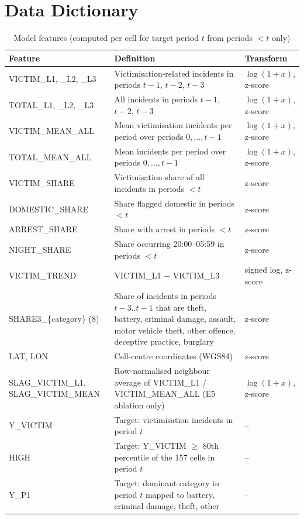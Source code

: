 \documentclass[11pt,a4paper]{report}
\renewcommand{\thesection}{\thechapter.\arabic{section}}
\begin{document}
\appendix
\renewcommand{\thesection}{\thechapter.\arabic{section}}

\chapter{Data Dictionary}
\label{app:dict}
\begin{table}[H]
\centering\scriptsize
\caption{Model features (computed per cell for target period $t$ from periods $<t$ only)}
\label{tab:dict}
\begin{tabularx}{\textwidth}{@{}L{4.2cm} Y L{2.6cm}@{}}
\toprule
Feature & Definition & Transform\\
\midrule
VICTIM\_L1, \_L2, \_L3 & Victimisation-related incidents in periods $t-1$, $t-2$, $t-3$ & $\log(1+x)$, z-score\\
TOTAL\_L1, \_L2, \_L3 & All incidents in periods $t-1$, $t-2$, $t-3$ & $\log(1+x)$, z-score\\
VICTIM\_MEAN\_ALL & Mean victimisation incidents per period over periods $0,\dots,t-1$ & $\log(1+x)$, z-score\\
TOTAL\_MEAN\_ALL & Mean incidents per period over periods $0,\dots,t-1$ & $\log(1+x)$, z-score\\
VICTIM\_SHARE & Victimisation share of all incidents in periods $<t$ & z-score\\
DOMESTIC\_SHARE & Share flagged domestic in periods $<t$ & z-score\\
ARREST\_SHARE & Share with arrest in periods $<t$ & z-score\\
NIGHT\_SHARE & Share occurring 20:00--05:59 in periods $<t$ & z-score\\
VICTIM\_TREND & VICTIM\_L1 $-$ VICTIM\_L3 & signed log, z-score\\
SHARE3\_\{category\} (8) & Share of incidents in periods $t-3..t-1$ that are theft, battery, criminal damage, assault, motor vehicle theft, other offence, deceptive practice, burglary & z-score\\
LAT, LON & Cell-centre coordinates (WGS84) & z-score\\
SLAG\_VICTIM\_L1, SLAG\_VICTIM\_MEAN & Row-normalised neighbour average of VICTIM\_L1 / VICTIM\_MEAN\_ALL (E5 ablation only) & $\log(1+x)$, z-score\\
\midrule
Y\_VICTIM & Target: victimisation incidents in period $t$ & --\\
HIGH & Target: Y\_VICTIM $\geq$ 80th percentile of the 157 cells in period $t$ & --\\
Y\_P1 & Target: dominant category in period $t$ mapped to battery, criminal damage, theft, other & --\\
\bottomrule
\end{tabularx}
\end{table}
\end{document}
